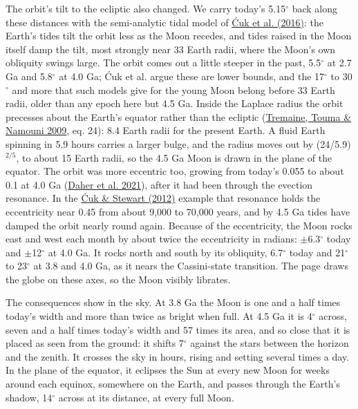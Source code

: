 \documentclass[9pt,twocolumn]{extarticle}
\begin{document}
The orbit's tilt to the ecliptic also changed. We carry today's 5.15$^\circ$ back along these distances with the semi-analytic tidal model of \protect\hyperlink{cite.cuk2016}{Ćuk et al. (2016)}: the Earth's tides tilt the orbit less as the Moon recedes, and tides raised in the Moon itself damp the tilt, most strongly near 33 Earth radii, where the Moon's own obliquity swings large. The orbit comes out a little steeper in the past, 5.5$^\circ$ at 2.7 Ga and 5.8$^\circ$ at 4.0 Ga; Ćuk et al. argue these are lower bounds, and the 17$^\circ$ to 30$^\circ$ and more that such models give for the young Moon belong before 33 Earth radii, older than any epoch here but 4.5 Ga. Inside the Laplace radius the orbit precesses about the Earth's equator rather than the ecliptic (\protect\hyperlink{cite.tremaine2009}{Tremaine, Touma \& Namouni 2009}, eq. 24): 8.4 Earth radii for the present Earth. A fluid Earth spinning in 5.9 hours carries a larger bulge, and the radius moves out by (24/5.9)$^{2/5}$, to about 15 Earth radii, so the 4.5 Ga Moon is drawn in the plane of the equator. The orbit was more eccentric too, growing from today's 0.055 to about 0.1 at 4.0 Ga (\protect\hyperlink{cite.daher2021}{Daher et al. 2021}), after it had been through the evection resonance. In the \protect\hyperlink{cite.cuk2012}{Ćuk \& Stewart (2012)} example that resonance holds the eccentricity near 0.45 from about 9,000 to 70,000 years, and by 4.5 Ga tides have damped the orbit nearly round again. Because of the eccentricity, the Moon rocks east and west each month by about twice the eccentricity in radians: $\pm$6.3$^\circ$ today and $\pm$12$^\circ$ at 4.0 Ga. It rocks north and south by its obliquity, 6.7$^\circ$ today and 21$^\circ$ to 23$^\circ$ at 3.8 and 4.0 Ga, as it nears the Cassini-state transition. The page draws the globe on these axes, so the Moon visibly librates.

The consequences show in the sky. At 3.8 Ga the Moon is one and a half times today's width and more than twice as bright when full. At 4.5 Ga it is 4$^\circ$ across, seven and a half times today's width and 57 times its area, and so close that it is placed as seen from the ground: it shifts 7$^\circ$ against the stars between the horizon and the zenith. It crosses the sky in hours, rising and setting several times a day. In the plane of the equator, it eclipses the Sun at every new Moon for weeks around each equinox, somewhere on the Earth, and passes through the Earth's shadow, 14$^\circ$ across at its distance, at every full Moon.
\end{document}
